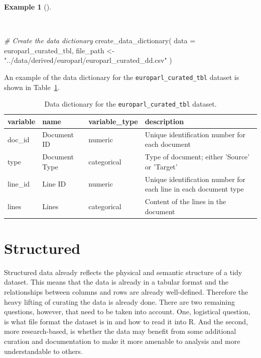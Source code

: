 \documentclass[
  letterpaper,
  DIV=11,
  numbers=noendperiod]{scrreport}
\newenvironment{Shaded}{\begin{snugshade}}{\end{snugshade}}
\newcommand{\AttributeTok}[1]{\textcolor[rgb]{0.00,0.00,0.00}{#1}}
\newcommand{\CommentTok}[1]{\textcolor[rgb]{0.00,0.00,0.00}{\textit{#1}}}
\newcommand{\FunctionTok}[1]{\textcolor[rgb]{0.00,0.00,0.00}{#1}}
\newcommand{\NormalTok}[1]{\textcolor[rgb]{0.00,0.00,0.00}{#1}}
\newcommand{\OtherTok}[1]{\textcolor[rgb]{0.00,0.00,0.00}{#1}}
\newcommand{\StringTok}[1]{\textcolor[rgb]{0.00,0.00,0.00}{#1}}
\theoremstyle{definition}
\newtheorem{example}{Example}[chapter]
\theoremstyle{remark}
\begin{document}
\begin{example}[]\protect\hypertarget{exm-cd-unstructured-data-dictionary}{}\label{exm-cd-unstructured-data-dictionary}

~

\begin{Shaded}
\begin{Highlighting}[]
\CommentTok{\# Create the data dictionary}
\FunctionTok{create\_data\_dictionary}\NormalTok{(}
  \AttributeTok{data =}\NormalTok{ europarl\_curated\_tbl,}
\NormalTok{  file\_path }\OtherTok{\textless{}{-}} \StringTok{"../data/derived/europarl/europarl\_curated\_dd.csv"}
\NormalTok{)}
\end{Highlighting}
\end{Shaded}

\end{example}

An example of the data dictionary for the
\texttt{europarl\_curated\_tbl} dataset is shown in
Table~\ref{tbl-cd-unstructured-data-dictionary-example}.

\hypertarget{tbl-cd-unstructured-data-dictionary-example}{}
\begin{table}
\caption{\label{tbl-cd-unstructured-data-dictionary-example}Data dictionary for the \texttt{europarl\_curated\_tbl} dataset. }\tabularnewline

\centering
\begin{tabular}{l|l|l|l}
\hline
variable & name & variable\_type & description\\
\hline
doc\_id & Document ID & numeric & Unique identification number for each document\\
\hline
type & Document Type & categorical & Type of document; either 'Source' or 'Target'\\
\hline
line\_id & Line ID & numeric & Unique identification number for each line in each document type\\
\hline
lines & Lines & categorical & Content of the lines in the document\\
\hline
\end{tabular}
\end{table}

\hypertarget{structured}{%
\section{Structured}\label{structured}}

Structured data already reflects the physical and semantic structure of
a tidy dataset. This means that the data is already in a tabular format
and the relationships between columns and rows are already well-defined.
Therefore the heavy lifting of curating the data is already done. There
are two remaining questions, however, that need to be taken into
account. One, logistical question, is what file format the dataset is in
and how to read it into R. And the second, more research-based, is
whether the data may benefit from some additional curation and
documentation to make it more amenable to analysis and more
understandable to others.
\end{document}
